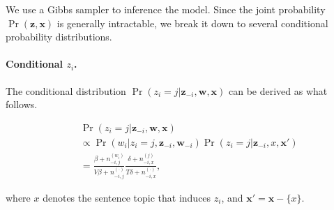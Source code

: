 We use a Gibbs sampler to inference the model.  Since the joint probability
$\Pr(\mathbf{z}, \mathbf{x})$ is generally intractable, we break it down to
several conditional probability distributions. 

\paragraph{Conditional $z_i$.}  
The conditional distribution $\Pr(z_i = j|\mathbf{z}_{-i}, \mathbf{w}, \mathbf{x})$ can
be derived as what follows.
\begin{small}
\begin{eqnarray*}
  && \Pr(z_i = j|\mathbf{z}_{-i}, \mathbf{w}, \mathbf{x}) \nonumber\\
  && \propto \Pr(w_i|z_i = j, \mathbf{z}_{-i}, \mathbf{w}_{-i}) \Pr(z_i = j|\mathbf{z}_{-i}, x, \mathbf{x}') \nonumber \\
  && = \frac{\beta + n_{-i,j}^{(w_i)}}{V \beta + n_{-i,j}^{(\cdot)}} \frac{\delta + n_{-i,x}^{(j)}}{T \delta + n_{-i,x}^{(\cdot)}}, \label{z_i:2.3}
\end{eqnarray*}
\end{small}
where $x$ denotes the sentence topic that induces $z_i$, and $\mathbf{x}' = \mathbf{x} - \{ x \}$.  



